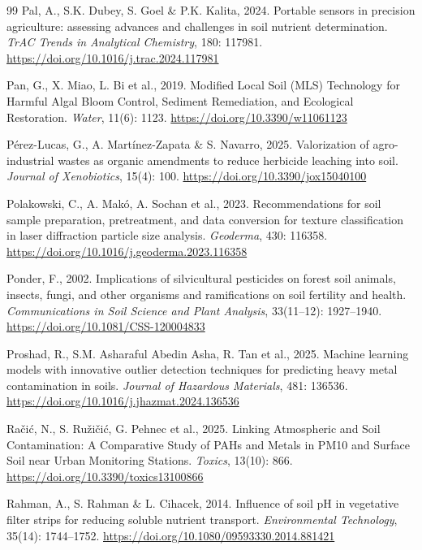 \documentclass[sn-mathphys-num]{sn-jnl}
\begin{document}
\begin{thebibliography}{99}
Pal, A., S.K. Dubey, S. Goel \& P.K. Kalita, 2024.
Portable sensors in precision agriculture: assessing advances and challenges
in soil nutrient determination.
\textit{TrAC Trends in Analytical Chemistry}, 180: 117981.
\url{https://doi.org/10.1016/j.trac.2024.117981}

Pan, G., X. Miao, L. Bi et al., 2019.
Modified Local Soil (MLS) Technology for Harmful Algal Bloom Control,
Sediment Remediation, and Ecological Restoration.
\textit{Water}, 11(6): 1123.
\url{https://doi.org/10.3390/w11061123}

P\'{e}rez-Lucas, G., A. Mart\'{i}nez-Zapata \& S. Navarro, 2025.
Valorization of agro-industrial wastes as organic amendments to reduce
herbicide leaching into soil.
\textit{Journal of Xenobiotics}, 15(4): 100.
\url{https://doi.org/10.3390/jox15040100}

Polakowski, C., A. Mak\'{o}, A. Sochan et al., 2023.
Recommendations for soil sample preparation, pretreatment, and data
conversion for texture classification in laser diffraction particle size
analysis.
\textit{Geoderma}, 430: 116358.
\url{https://doi.org/10.1016/j.geoderma.2023.116358}

Ponder, F., 2002.
Implications of silvicultural pesticides on forest soil animals, insects,
fungi, and other organisms and ramifications on soil fertility and health.
\textit{Communications in Soil Science and Plant Analysis},
33(11--12): 1927--1940.
\url{https://doi.org/10.1081/CSS-120004833}

Proshad, R., S.M. Asharaful Abedin Asha, R. Tan et al., 2025.
Machine learning models with innovative outlier detection techniques for
predicting heavy metal contamination in soils.
\textit{Journal of Hazardous Materials}, 481: 136536.
\url{https://doi.org/10.1016/j.jhazmat.2024.136536}

Ra\v{c}i\'{c}, N., S. Ru\v{z}i\v{c}i\'{c}, G. Pehnec et al., 2025.
Linking Atmospheric and Soil Contamination: A Comparative Study of PAHs and
Metals in PM10 and Surface Soil near Urban Monitoring Stations.
\textit{Toxics}, 13(10): 866.
\url{https://doi.org/10.3390/toxics13100866}

Rahman, A., S. Rahman \& L. Cihacek, 2014.
Influence of soil pH in vegetative filter strips for reducing soluble nutrient
transport.
\textit{Environmental Technology}, 35(14): 1744--1752.
\url{https://doi.org/10.1080/09593330.2014.881421}


\end{thebibliography}
\end{document}
